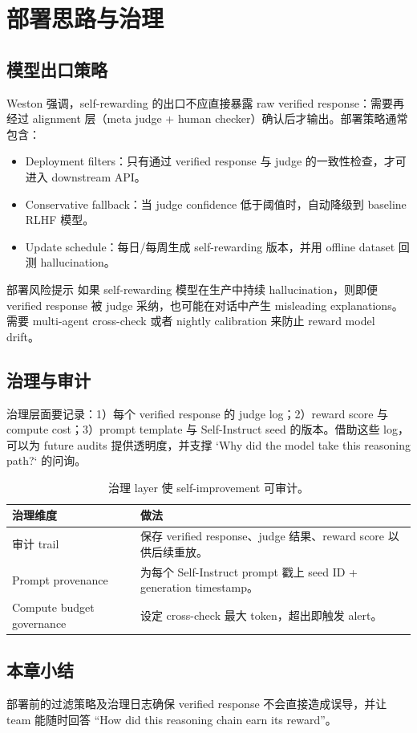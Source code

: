 \section{部署思路与治理}
\subsection{模型出口策略}
Weston 强调，self-rewarding 的出口不应直接暴露 raw verified response：需要再经过 alignment 层（meta judge + human checker）确认后才输出。部署策略通常包含：
\begin{itemize}
    \item Deployment filters：只有通过 verified response 与 judge 的一致性检查，才可进入 downstream API。
    \item Conservative fallback：当 judge confidence 低于阈值时，自动降级到 baseline RLHF 模型。
    \item Update schedule：每日/每周生成 self-rewarding 版本，并用 offline dataset 回测 hallucination。
\end{itemize}

\begin{warningbox}{部署风险提示}
如果 self-rewarding 模型在生产中持续 hallucination，则即便 verified response 被 judge 采纳，也可能在对话中产生 misleading explanations。需要 multi-agent cross-check 或者 nightly calibration 来防止 reward model drift。
\end{warningbox}

\subsection{治理与审计}
治理层面要记录：1）每个 verified response 的 judge log；2）reward score 与 compute cost；3）prompt template 与 Self-Instruct seed 的版本。借助这些 log，可以为 future audits 提供透明度，并支撑 `Why did the model take this reasoning path?` 的问询。

\begin{table}[H]
\centering
\begin{tabular}{p{5cm}p{10cm}}
\toprule
治理维度 & 做法 \\
\midrule
审计 trail & 保存 verified response、judge 结果、reward score 以供后续重放。 \\
Prompt provenance & 为每个 Self-Instruct prompt 戳上 seed ID + generation timestamp。 \\
Compute budget governance & 设定 cross-check 最大 token，超出即触发 alert。 \\
\bottomrule
\end{tabular}
\caption{治理 layer 使 self-improvement 可审计。}
\end{table}

\subsection{本章小结}
部署前的过滤策略及治理日志确保 verified response 不会直接造成误导，并让 team 能随时回答 ``How did this reasoning chain earn its reward''。

